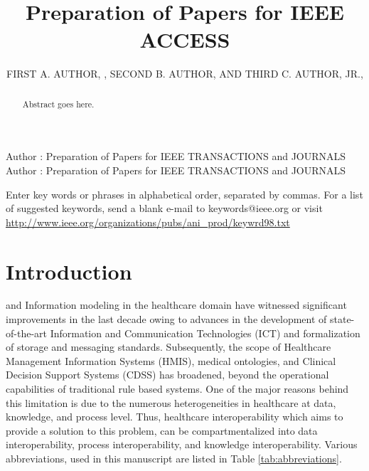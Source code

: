 \documentclass{ieeeaccess}
\begin{document}

\title{Preparation of Papers for IEEE ACCESS}
\author{\uppercase{First A. Author}, ,
\uppercase{Second B. Author, and Third C. Author,
Jr}.,
}
\address[1]{National Institute of Standards and 
Technology, Boulder, CO 80305 USA (e-mail: author@boulder.nist.gov)}
\address[2]{Department of Physics, Colorado State University, Fort Collins, 
CO 80523 USA (e-mail: author@lamar.colostate.edu)}
\address[3]{Electrical Engineering Department, University of Colorado, Boulder, CO 
80309 USA}

\markboth
{Author \headeretal: Preparation of Papers for IEEE TRANSACTIONS and JOURNALS}
{Author \headeretal: Preparation of Papers for IEEE TRANSACTIONS and JOURNALS}


\begin{abstract}
Abstract goes here.
\end{abstract}

\begin{keywords}
Enter key words or phrases in alphabetical 
order, separated by commas. For a list of suggested keywords, send a blank 
e-mail to keywords@ieee.org or visit \underline
{http://www.ieee.org/organizations/pubs/ani\_prod/keywrd98.txt}
\end{keywords}

\titlepgskip=-15pt

\maketitle

\section{Introduction}
\label{intro}
 and Information modeling in the healthcare domain have witnessed significant improvements in the last decade owing to advances in the development of state-of-the-art Information and Communication Technologies (ICT) and formalization of storage and messaging standards. Subsequently, the scope of Healthcare Management Information Systems (HMIS), medical ontologies, and Clinical Decision Support Systems (CDSS) has broadened, beyond the operational capabilities of traditional rule based systems. One of the major reasons behind this limitation is due to the numerous heterogeneities in healthcare at data, knowledge, and process level. Thus, healthcare interoperability which aims to provide a solution to this problem, can be compartmentalized into data interoperability, process interoperability, and knowledge interoperability. Various abbreviations, used in this manuscript are listed in Table \ref{tab:abbreviations}.
\end{document}

